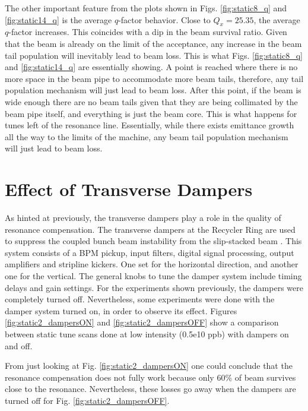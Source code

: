 The other important feature from the plots shown in Figs. \ref{fig:static8_q} and \ref{fig:static14_q} is the average $q$-factor behavior. Close to $Q_x=25.35$, the average $q$-factor increases. This coincides with a dip in the beam survival ratio. Given that the beam is already on the limit of the acceptance, any increase in the beam tail population will inevitably lead to beam loss. This is what Figs. \ref{fig:static8_q} and \ref{fig:static14_q} are essentially showing. A point is reached where there is no more space in the beam pipe to accommodate more beam tails, therefore, any tail population mechanism will just lead to beam loss. After this point, if the beam is wide enough there are no beam tails given that they are being collimated by the beam pipe itself, and everything is just the beam core. This is what happens for tunes left of the resonance line. Essentially, while there exists emittance growth all the way to the limits of the machine, any beam tail population mechanism will just lead to beam loss. 

\section{\label{sec:ch6dampers}Effect of Transverse Dampers}

As hinted at previously, the transverse dampers play a role in the quality of resonance compensation. The transverse dampers at the Recycler Ring are used to suppress the coupled bunch beam instability from the slip-stacked beam \cite{dampers1,dampers2}. This system consists of a BPM pickup, input filters, digital signal processing, output amplifiers and stripline kickers. One set for the horizontal direction, and another one for the vertical. The general knobs to tune the damper system include timing delays and gain settings. For the experiments shown previously, the dampers were completely turned off. Nevertheless, some experiments were done with the damper system turned on, in order to observe its effect. Figures \ref{fig:static2_dampersON} and \ref{fig:static2_dampersOFF} show a comparison between static tune scans done at low intensity (0.5e10 ppb) with dampers on and off.

From just looking at Fig. \ref{fig:static2_dampersON} one could conclude that the resonance compensation does not fully work because only 60\% of beam survives close to the resonance. Nevertheless, these losses go away when the dampers are turned off for Fig. \ref{fig:static2_dampersOFF}.  

